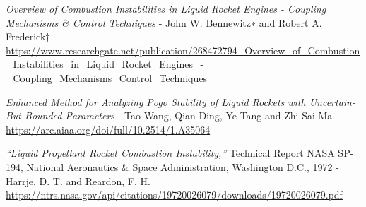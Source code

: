 \documentclass[8pt]{article} %
\begin{document}
\begin{thebibliography}{99}
\emph{Overview of Combustion Instabilities in Liquid Rocket Engines - Coupling Mechanisms \& Control Techniques} - John W. Bennewitz∗ and Robert A. Frederick†\\ \url{https://www.researchgate.net/publication/268472794_Overview_of_Combustion_Instabilities_in_Liquid_Rocket_Engines_-_Coupling_Mechanisms_Control_Techniques}

\emph{Enhanced Method for Analyzing Pogo Stability of Liquid Rockets with Uncertain-But-Bounded Parameters} - Tao Wang, Qian Ding, Ye Tang and Zhi-Sai Ma\\ \url{https://arc.aiaa.org/doi/full/10.2514/1.A35064}

\emph{“Liquid Propellant Rocket Combustion Instability,”} Technical Report NASA SP-194, National Aeronautics \& Space Administration, Washington D.C., 1972 - Harrje, D. T. and Reardon, F. H.\\ \url{https://ntrs.nasa.gov/api/citations/19720026079/downloads/19720026079.pdf}
\end{thebibliography}
\end{document}
